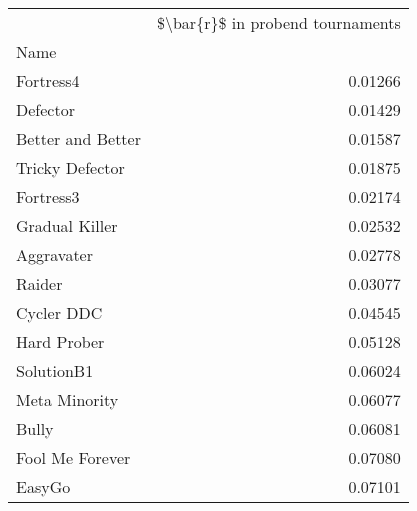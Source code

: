 \begin{tabular}{lr}
\toprule
{} &  \$\textbackslash bar\{r\}\$ in probend tournaments \\
Name              &                                   \\
\midrule
Fortress4         &                           0.01266 \\
Defector          &                           0.01429 \\
Better and Better &                           0.01587 \\
Tricky Defector   &                           0.01875 \\
Fortress3         &                           0.02174 \\
Gradual Killer    &                           0.02532 \\
Aggravater        &                           0.02778 \\
Raider            &                           0.03077 \\
Cycler DDC        &                           0.04545 \\
Hard Prober       &                           0.05128 \\
SolutionB1        &                           0.06024 \\
Meta Minority     &                           0.06077 \\
Bully             &                           0.06081 \\
Fool Me Forever   &                           0.07080 \\
EasyGo            &                           0.07101 \\
\bottomrule
\end{tabular}
